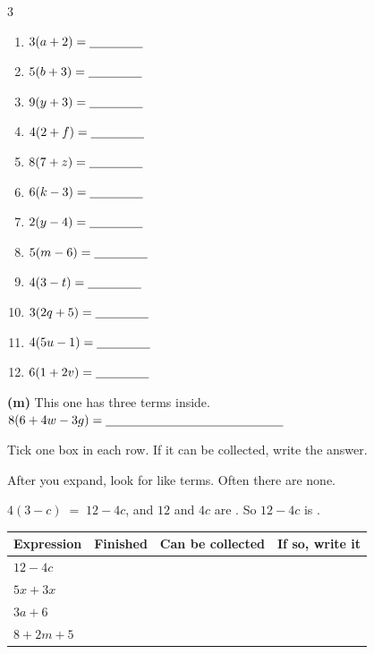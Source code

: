 \documentclass[12pt,a4paper]{article}
\begin{document}
\vspace{2pt}
\begin{multicols}{3}
\begin{enumerate}[label=(\alph*), itemsep=11pt]
  \item $3(a + 2) = \blank[1.5cm]$
  \item $5(b + 3) = \blank[1.5cm]$
  \item $9(y + 3) = \blank[1.5cm]$
  \item $4(2 + f) = \blank[1.5cm]$
  \item $8(7 + z) = \blank[1.5cm]$
  \item $6(k - 3) = \blank[1.5cm]$
  \item $2(y - 4) = \blank[1.5cm]$
  \item $5(m - 6) = \blank[1.5cm]$
  \item $4(3 - t) = \blank[1.5cm]$
  \item $3(2q + 5) = \blank[1.5cm]$
  \item $4(5u - 1) = \blank[1.5cm]$
  \item $6(1 + 2v) = \blank[1.5cm]$
\end{enumerate}
\end{multicols}

\vspace{2pt}
\noindent \textbf{(m)} This one has three terms inside. \quad $8(6 + 4w - 3g) =
\blank[5.0cm]$


\noindent Tick one box in each row. If it can be collected, write the answer.

\begin{remember}
  After you expand, look for like terms. Often there are none.

  \smallskip
  \hspace*{1.2em}$4(3 - c) \;=\; 12 - 4c$, \; and $12$ and $4c$ are
  . So $12 - 4c$ is .
\end{remember}

\vspace{2pt}
\noindent
\begin{tabularx}{\textwidth}{|p{3.7cm}|c|c|X|}
  \hline
  \textbf{Expression} & \textbf{Finished} & \textbf{Can be collected} &
  \textbf{If so, write it} \\
  \hline
  $12 - 4c$ \rule[-0.7em]{0pt}{2.2em}       & & & \\ \hline
  $5x + 3x$ \rule[-0.7em]{0pt}{2.2em}       & & & \\ \hline
  $3a + 6$ \rule[-0.7em]{0pt}{2.2em}        & & & \\ \hline
  $8 + 2m + 5$ \rule[-0.7em]{0pt}{2.2em}    & & & \\ \hline
\end{tabularx}
\end{document}
